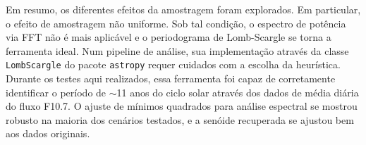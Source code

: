 Em resumo, os diferentes efeitos da amostragem foram explorados. Em particular, o efeito de amostragem não uniforme. Sob tal condição, o espectro de potência via FFT não é mais aplicável e o periodograma de Lomb-Scargle se torna a ferramenta ideal. Num pipeline de análise, sua implementação através da classe \texttt{LombScargle} do pacote \texttt{astropy} requer cuidados com a escolha da heurística. Durante os testes aqui realizados, essa ferramenta foi capaz de corretamente identificar o período de $\sim$11 anos do ciclo solar através dos dados de média diária do fluxo F10.7. O ajuste de mínimos quadrados para análise espectral se mostrou robusto na maioria dos cenários testados, e a senóide recuperada se ajustou bem aos dados originais. %



